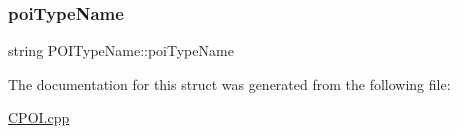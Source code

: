 \mbox{\label{structPOITypeName_a2db157ca193d5d994f216f29377d24d1}} 
\subsubsection{\texorpdfstring{poi\+Type\+Name}{poiTypeName}}
{\footnotesize\ttfamily string P\+O\+I\+Type\+Name\+::poi\+Type\+Name}



The documentation for this struct was generated from the following file\+:\begin{DoxyCompactItemize}
\item 
\hyperlink{CPOI_8cpp}{C\+P\+O\+I.\+cpp}\end{DoxyCompactItemize}
